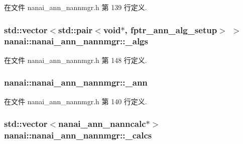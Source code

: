 在文件 nanai\+\_\+ann\+\_\+nannmgr.\+h 第 139 行定义.

\hypertarget{classnanai_1_1nanai__ann__nannmgr_a3402ccfa83590793eb0755110e4a023e}{}
\subsubsection[{\+\_\+algs}]{\setlength{\rightskip}{0pt plus 5cm}std\+::vector$<$std\+::pair$<$void$\ast$, {\bf fptr\+\_\+ann\+\_\+alg\+\_\+setup}$>$ $>$ nanai\+::nanai\+\_\+ann\+\_\+nannmgr\+::\+\_\+algs\hspace{0.3cm}{\ttfamily [protected]}}\label{classnanai_1_1nanai__ann__nannmgr_a3402ccfa83590793eb0755110e4a023e}


在文件 nanai\+\_\+ann\+\_\+nannmgr.\+h 第 148 行定义.

\hypertarget{classnanai_1_1nanai__ann__nannmgr_aa808696e65d0f030afe6e2de2b7d3e6d}{}
\subsubsection[{\+\_\+ann}]{ nanai\+::nanai\+\_\+ann\+\_\+nannmgr\+::\+\_\+ann\hspace{0.3cm}{\ttfamily [protected]}}\label{classnanai_1_1nanai__ann__nannmgr_aa808696e65d0f030afe6e2de2b7d3e6d}


在文件 nanai\+\_\+ann\+\_\+nannmgr.\+h 第 140 行定义.

\hypertarget{classnanai_1_1nanai__ann__nannmgr_a25dc5374ad7545e1c6255afb647264a9}{}
\subsubsection[{\+\_\+calcs}]{\setlength{\rightskip}{0pt plus 5cm}std\+::vector$<${\bf nanai\+\_\+ann\+\_\+nanncalc}$\ast$$>$ nanai\+::nanai\+\_\+ann\+\_\+nannmgr\+::\+\_\+calcs\hspace{0.3cm}{\ttfamily [protected]}}\label{classnanai_1_1nanai__ann__nannmgr_a25dc5374ad7545e1c6255afb647264a9}


